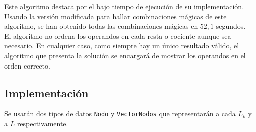 Este algoritmo destaca por el bajo tiempo de ejecución de su implementación. Usando la versión modificada para hallar combinaciones mágicas de este algoritmo, se han obtenido todas las combinaciones mágicas en $52,1$ segundos.\\

El algoritmo no ordena los operandos en cada resta o cociente aunque sea necesario.
En cualquier caso, como siempre hay un único resultado válido, el algoritmo que
presenta la solución se encargará de mostrar los operandos en el orden correcto.

\subsection{Implementación}

Se usarán dos tipos de datos \texttt{Nodo} y \texttt{VectorNodos} que representarán a cada $L_k$ y a $L$ respectivamente.


